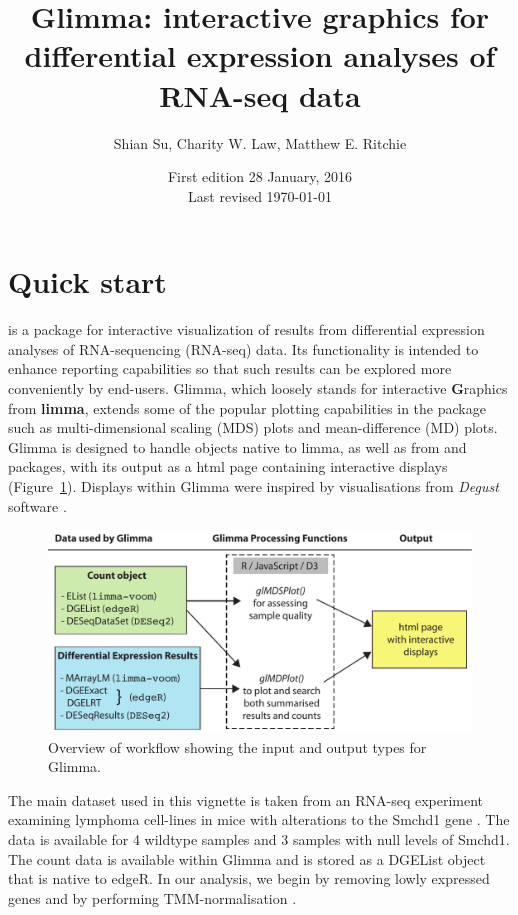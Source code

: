 \documentclass{article}
\begin{document}


\title{Glimma: interactive graphics for differential expression analyses of RNA-seq data}
\author{Shian Su, Charity W. Law, Matthew E. Ritchie}
\date{First edition 28 January, 2016\\
Last revised \today}
\maketitle

\tableofcontents

\section{Quick start}\label{sec:quickstart}
 is a \Bioconductor{} package for interactive visualization of results from differential expression analyses of RNA-sequencing (RNA-seq) data. Its functionality is intended to enhance reporting capabilities so that such results can be explored more conveniently by end-users. Glimma, which loosely stands for interactive {\bf G}raphics from {\bf limma}, extends some of the popular plotting capabilities in the  \cite{limma} package such as multi-dimensional scaling (MDS) plots and mean-difference (MD) plots. Glimma is designed to handle objects native to limma, as well as from  \cite{edgeR} and  \cite{DESeq2} packages, with its output as a html page containing interactive displays (Figure~\ref{fig:overview}).
Displays within Glimma were inspired by visualisations from {\it Degust} software \cite{Degust}.

\begin{figure}[!ht]
  \centerline{\includegraphics[width=0.65\linewidth]{GlimmaWorkFlow.pdf}}
  \caption{Overview of workflow showing the input and output types for Glimma.}
  \label{fig:overview}
\end{figure}

The main dataset used in this vignette is taken from an RNA-seq experiment examining lymphoma cell-lines in mice with alterations to the Smchd1 gene \cite{Smchd1}. The data is available for 4 wildtype samples and 3 samples with null levels of Smchd1. The count data is available within Glimma and is stored as a {\sf DGEList} object that is native to edgeR. In our analysis, we begin by removing lowly expressed genes and by performing TMM-normalisation \cite{tmm}.
\end{document}
